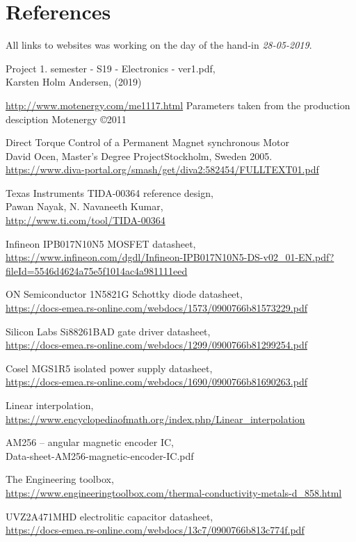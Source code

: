 \section{References}
\label{sec:references}
All links to websites was working on the day of the hand-in \textit{28-05-2019}.


\begin{thebibliography}{9}
Project 1. semester - S19 - Electronics - ver1.pdf, \\
Karsten Holm Andersen, (2019)

\url{http://www.motenergy.com/me1117.html}
Parameters taken from the production desciption
Motenergy \copyright 2011

Direct Torque Control of a Permanent Magnet synchronous Motor\\
David Ocen, Master's Degree ProjectStockholm, Sweden 2005.\\
\url{https://www.diva-portal.org/smash/get/diva2:582454/FULLTEXT01.pdf}

Texas Instruments TIDA-00364 reference design, \\
Pawan Nayak, N. Navaneeth Kumar, \\
\url{http://www.ti.com/tool/TIDA-00364}

Infineon IPB017N10N5  MOSFET datasheet, \\
\url{https://www.infineon.com/dgdl/Infineon-IPB017N10N5-DS-v02_01-EN.pdf?fileId=5546d4624a75e5f1014ac4a981111eed}

ON Semiconductor 1N5821G Schottky diode datasheet, \\
\url{https://docs-emea.rs-online.com/webdocs/1573/0900766b81573229.pdf}

Silicon Labs Si88261BAD gate driver datasheet, \\
\url{https://docs-emea.rs-online.com/webdocs/1299/0900766b81299254.pdf}

Cosel MGS1R5 isolated power supply datasheet, \\
\url{https://docs-emea.rs-online.com/webdocs/1690/0900766b81690263.pdf}

Linear interpolation,  \\
\url{https://www.encyclopediaofmath.org/index.php/Linear_interpolation}

AM256 – angular magnetic encoder IC, \\
Data-sheet-AM256-magnetic-encoder-IC.pdf 

The Engineering toolbox, \\
\url{https://www.engineeringtoolbox.com/thermal-conductivity-metals-d_858.html}

UVZ2A471MHD electrolitic capacitor datasheet, \\
\url{https://docs-emea.rs-online.com/webdocs/13c7/0900766b813c774f.pdf}

\end{thebibliography}